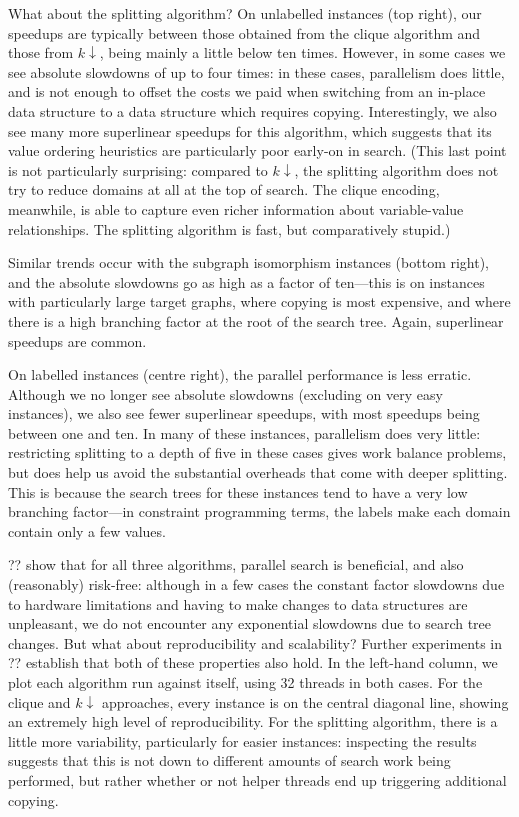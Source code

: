 \documentclass[sigconf]{acmart}
\begin{document}
What about the splitting algorithm? On unlabelled instances (top right), our speedups are typically
between those obtained from the clique algorithm and those from $k{\downarrow}$, being mainly a
little below ten times. However, in some cases we see absolute slowdowns of up to four times: in
these cases, parallelism does little, and is not enough to offset the costs we paid when switching
from an in-place data structure to a data structure which requires copying. Interestingly, we also
see many more superlinear speedups for this algorithm, which suggests that its value ordering
heuristics are particularly poor early-on in search. (This last point is not particularly
surprising: compared to $k{\downarrow}$, the splitting algorithm does not try to reduce domains at
all at the top of search. The clique encoding, meanwhile, is able to capture even richer information
about variable-value relationships. The splitting algorithm is fast, but comparatively stupid.)

Similar trends occur with the subgraph isomorphism instances (bottom right), and the absolute
slowdowns go as high as a factor of ten---this is on instances with particularly large
target graphs, where copying is most expensive, and where there is a high branching factor at the
root of the search tree. Again, superlinear speedups are common.

On labelled instances (centre right), the parallel performance is less erratic. Although we no
longer see absolute slowdowns (excluding on very easy instances), we also see fewer superlinear
speedups, with most speedups being between one and ten. In many of these instances, parallelism
does very little: restricting splitting to a depth of five in these cases gives work balance
problems, but does help us avoid the substantial overheads that come with deeper splitting. This is
because the search trees for these instances tend to have a very low branching factor---in
constraint programming terms, the labels make each domain contain only a few values.

?? show that for all three
algorithms, parallel search is beneficial, and also (reasonably) risk-free: although in a few cases the
constant factor slowdowns due to hardware limitations and having to make changes to data structures
are unpleasant, we do not encounter any exponential slowdowns due to search tree changes. But what
about reproducibility and scalability? Further experiments in ??
establish that both of these properties also hold. In the left-hand column, we plot each algorithm
run against itself, using 32 threads in both cases. For the clique and $k{\downarrow}$ approaches,
every instance is on the central diagonal line, showing an extremely high level of reproducibility.
For the splitting algorithm, there is a little more variability, particularly for easier instances:
inspecting the results suggests that this is not down to different amounts of search work being
performed, but rather whether or not helper threads end up triggering additional copying.
\end{document}
